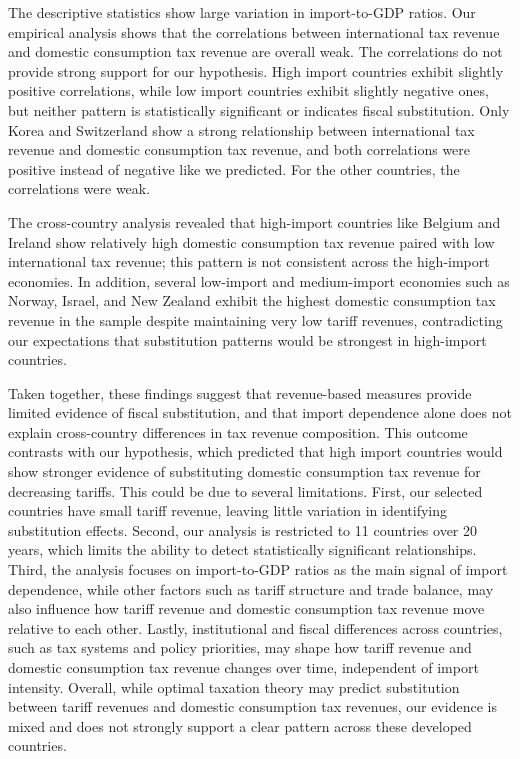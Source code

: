 \documentclass[12pt]{article}
\begin{document}
The descriptive statistics show large variation in import-to-GDP ratios.  Our empirical analysis shows that the correlations between international tax revenue and domestic consumption tax revenue are overall weak.  The correlations do not provide strong support for our hypothesis.  High import countries exhibit slightly positive correlations, while low import countries exhibit slightly negative ones, but neither pattern is statistically significant or indicates fiscal substitution.  Only Korea and Switzerland show a strong relationship between international tax revenue and domestic consumption tax revenue, and both correlations were positive instead of negative like we predicted.  For the other countries, the correlations were weak.  

The cross-country analysis revealed that high-import countries like Belgium and Ireland show relatively high domestic consumption tax revenue paired with low international tax revenue; this pattern is not consistent across the high-import economies. In addition, several low-import and medium-import economies such as Norway, Israel, and  New Zealand exhibit the highest domestic consumption tax revenue in the sample despite maintaining very low tariff revenues, contradicting our expectations that substitution patterns would be strongest in high-import countries. 

 Taken together, these findings suggest that revenue-based measures provide limited evidence of fiscal substitution, and that import dependence alone does not explain cross-country differences in tax revenue composition.  This outcome contrasts with our hypothesis, which predicted that high import countries would show stronger evidence of substituting domestic consumption tax revenue for decreasing tariffs.  This could be due to several limitations.  First, our selected countries have small tariff revenue, leaving little variation in identifying substitution effects.  Second, our analysis is restricted to 11 countries over 20 years, which limits the ability to detect statistically significant relationships.  Third, the analysis focuses on import-to-GDP ratios as the main signal of import dependence, while other factors such as tariff structure and trade balance, may also influence how tariff revenue and domestic consumption tax revenue move relative to each other.  Lastly, institutional and fiscal differences across countries, such as tax systems and policy priorities, may shape how tariff revenue and domestic consumption tax revenue changes over time, independent of import intensity.  Overall, while optimal taxation theory may predict substitution between tariff revenues and domestic consumption tax revenues, our evidence is mixed and does not strongly support a clear pattern across these developed countries.
\end{document}
